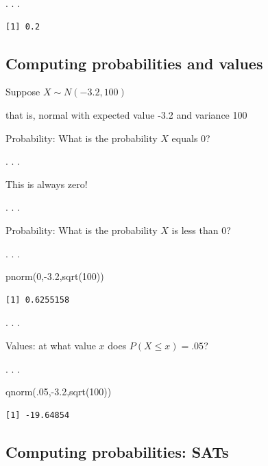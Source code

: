 \documentclass[
  letterpaper,
  DIV=11,
  numbers=noendperiod]{scrartcl}
\newenvironment{Shaded}{\begin{snugshade}}{\end{snugshade}}
\newcommand{\DecValTok}[1]{\textcolor[rgb]{0.68,0.00,0.00}{#1}}
\newcommand{\FloatTok}[1]{\textcolor[rgb]{0.68,0.00,0.00}{#1}}
\newcommand{\FunctionTok}[1]{\textcolor[rgb]{0.28,0.35,0.67}{#1}}
\newcommand{\NormalTok}[1]{\textcolor[rgb]{0.00,0.23,0.31}{#1}}
\newcommand{\SpecialCharTok}[1]{\textcolor[rgb]{0.37,0.37,0.37}{#1}}
\begin{document}
. . .

\begin{verbatim}
[1] 0.2
\end{verbatim}

\subsection{Computing probabilities and
values}\label{computing-probabilities-and-values-1}

Suppose \(X \sim N(-3.2, 100)\)

{that is, normal with expected value -3.2 and variance 100}

{Probability:} What is the probability \(X\) equals 0?

. . .

This is always zero!

. . .

{Probability:} What is the probability \(X\) is less than 0?

. . .

\begin{Shaded}
\begin{Highlighting}[]
\FunctionTok{pnorm}\NormalTok{(}\DecValTok{0}\NormalTok{,}\SpecialCharTok{{-}}\FloatTok{3.2}\NormalTok{,}\FunctionTok{sqrt}\NormalTok{(}\DecValTok{100}\NormalTok{))}
\end{Highlighting}
\end{Shaded}

\begin{verbatim}
[1] 0.6255158
\end{verbatim}

. . .

{Values:} at what value \(x\) does \(P(X\leq x) = .05\)?

. . .

\begin{Shaded}
\begin{Highlighting}[]
\FunctionTok{qnorm}\NormalTok{(.}\DecValTok{05}\NormalTok{,}\SpecialCharTok{{-}}\FloatTok{3.2}\NormalTok{,}\FunctionTok{sqrt}\NormalTok{(}\DecValTok{100}\NormalTok{))}
\end{Highlighting}
\end{Shaded}

\begin{verbatim}
[1] -19.64854
\end{verbatim}

\subsection{Computing probabilities:
SATs}\label{computing-probabilities-sats}
\end{document}
